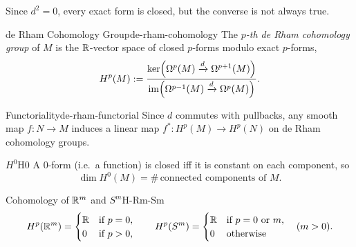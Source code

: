 Since $d^2 = 0$, every exact form is closed, but the converse is not always true.

\begin{definition}{de Rham Cohomology Group}{de-rham-cohomology}
    The \emph{$p$-th de Rham cohomology group} of $M$ is the $\mathbb{R}$-vector space of closed $p$-forms modulo exact $p$-forms,
    \[
        H^p(M) := \frac{\ker\!\left( \Omega^p(M) \xrightarrow{d} \Omega^{p+1}(M) \right)}{\operatorname{im}\!\left( \Omega^{p-1}(M) \xrightarrow{d} \Omega^p(M) \right)}.
    \]
\end{definition}

\begin{remark}{Functoriality}{de-rham-functorial}
    Since $d$ commutes with pullbacks, any smooth map $f \colon N \to M$ induces a linear map $f^* \colon H^p(M) \to H^p(N)$ on de Rham cohomology groups.
\end{remark}

\begin{example}{$H^0$}{H0}
    A $0$-form (i.e.\ a function) is closed iff it is constant on each component, so
    \[
        \dim H^0(M) = \#\,\text{connected components of } M.
    \]
\end{example}

\begin{remark}{Cohomology of $\mathbb{R}^m$ and $S^m$}{H-Rm-Sm}
    \[
        H^p(\mathbb{R}^m) = \begin{cases} \mathbb{R} & \text{if } p = 0, \\ 0 & \text{if } p > 0, \end{cases} \qquad
        H^p(S^m) = \begin{cases} \mathbb{R} & \text{if } p = 0 \text{ or } m, \\ 0 & \text{otherwise} \end{cases} \quad (m > 0).
    \]
\end{remark}
